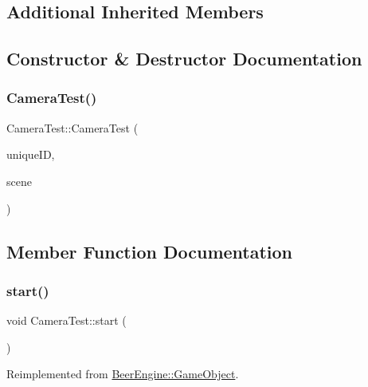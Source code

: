 \subsection*{Additional Inherited Members}


\subsection{Constructor \& Destructor Documentation}
\mbox{\label{class_camera_test_a87bcce0ea69a1a731e9e7743ecff602f}} 
\subsubsection{\texorpdfstring{Camera\+Test()}{CameraTest()}}
{\footnotesize\ttfamily Camera\+Test\+::\+Camera\+Test (\begin{DoxyParamCaption}\item[{int}]{unique\+ID,  }\item[{\mbox{\hyperlink{class_beer_engine_1_1_a_scene}{Beer\+Engine\+::\+A\+Scene}} \&}]{scene }\end{DoxyParamCaption})}



\subsection{Member Function Documentation}
\mbox{\label{class_camera_test_a33618b16d2906b67b68e55ad15a8a33b}} 
\subsubsection{\texorpdfstring{start()}{start()}}
{\footnotesize\ttfamily void Camera\+Test\+::start (\begin{DoxyParamCaption}\item[{void}]{ }\end{DoxyParamCaption})\hspace{0.3cm}{\ttfamily [virtual]}}



Reimplemented from \mbox{\hyperlink{class_beer_engine_1_1_game_object_a2caa6e6105c6766fdac3688ff1e74f00}{Beer\+Engine\+::\+Game\+Object}}.

